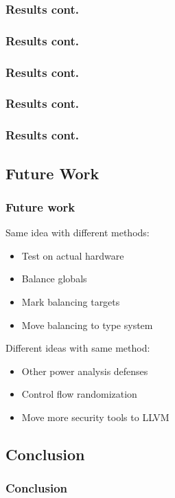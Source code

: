 \documentclass[11pt,t,usepdftitle=false,aspectratio=169]{beamer}
\begin{document}
\begin{frame}
  \frametitle{Results cont.}
  \frametitle{}

\end{frame}
\begin{frame}
  \frametitle{Results cont.}
  \frametitle{}

\end{frame}
\begin{frame}
  \frametitle{Results cont.}

\end{frame}
\begin{frame}
  \frametitle{Results cont.}

\end{frame}
\begin{frame}
  \frametitle{Results cont.}

\end{frame}

\subsection{Future Work}
\begin{frame}
  \frametitle{Future work}
  Same idea with different methods:
  \begin{itemize}
  \item Test on actual hardware
  \item Balance globals
  \item Mark balancing targets
  \item Move balancing to type system
  \end{itemize}
  \vspace{0.5cm}
  Different ideas with same method:
  \begin{itemize}
  \item Other power analysis defenses
  \item Control flow randomization
  \item Move more security tools to LLVM
  \end{itemize}
\end{frame}

\subsection{Conclusion}
\begin{frame}
  \frametitle{Conclusion}

\end{frame}
\end{document}

